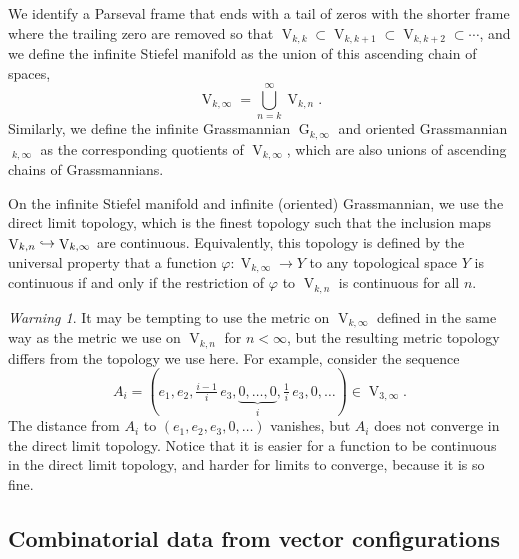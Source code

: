 \documentclass[11pt]{article}
\numberwithin{equation}{section}
\newcommand\hto{\mathrel{\lhook\joinrel\to}}
\theoremstyle{remark}
\newtheorem{warning}[theorem]{Warning}
\let\phi\varphi
\DeclareMathOperator{\g}{G}
\DeclareMathOperator{\oG}{\widetilde G}
\DeclareMathOperator{\stief}{V}
\begin{document}
We identify a Parseval frame that ends with a tail of zeros with the shorter frame where the trailing zero are removed so that $\stief_{k,k} \subset \stief_{k,k+1} \subset \stief_{k,k+2} \subset \cdots$,
and we define the infinite Stiefel manifold as the union of this ascending chain of spaces,
\[ \stief_{k,\infty} = \bigcup_{n=k}^\infty \stief_{k,n}. \]
Similarly, we define the infinite Grassmannian $\g_{k,\infty}$ and oriented Grassmannian $\oG_{k,\infty}$ as the corresponding quotients of $\stief_{k,\infty}$, which are also unions of ascending chains of Grassmannians.

On the infinite Stiefel manifold and infinite (oriented) Grassmannian, we use the direct limit topology, which is the finest topology such that the inclusion maps \hbox{$\stief_{k,n} \hto \stief_{k,\infty}$} are continuous.
Equivalently, this topology is defined by the universal property that a function $\phi : \stief_{k,\infty} \to Y$ to any topological space $Y$ is continuous if and only if the restriction of $\phi$ to $\stief_{k,n}$ is continuous for all $n$.

\begin{warning}
It may be tempting to use the metric on $\stief_{k,\infty}$ defined in the same way as the metric we use on $\stief_{k,n}$ for $n<\infty$, but the resulting metric topology differs from the topology we use here.
For example, consider the sequence
\[A_i = (e_1,e_2,\tfrac{i-1}{i}\,e_3,\underbrace{0,\dots,0}_i,\tfrac{1}{i}\,e_3,0,\dots) \in \stief_{3,\infty}. \]
The distance from $A_i$ to $(e_1,e_2,e_3,0,\dots)$ vanishes, but $A_i$ does not converge in the direct limit topology.
Notice that it is easier for a function to be continuous in the direct limit topology, and harder for limits to converge, because it is so fine.
\end{warning}

\subsection{Combinatorial data from vector configurations}\label{subsection-combinatorial-data}
\end{document}
